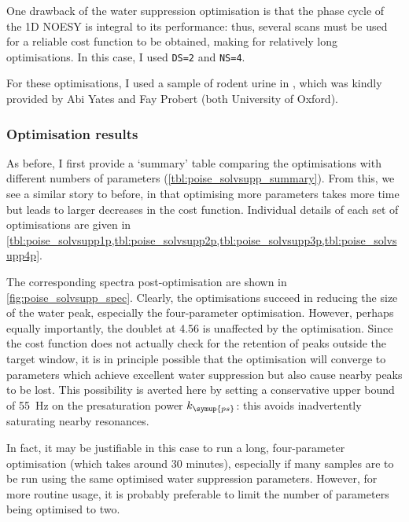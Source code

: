 One drawback of the water suppression optimisation is that the phase cycle of the 1D NOESY is integral to its performance: thus, several scans must be used for a reliable cost function to be obtained, making for relatively long optimisations.
In this case, I used \texttt{DS=2} and \texttt{NS=4}.

For these optimisations, I used a sample of rodent urine in , which was kindly provided by Abi Yates and Fay Probert (both University of Oxford).



\subsubsection{Optimisation results}

As before, I first provide a `summary' table comparing the optimisations with different numbers of parameters (\cref{tbl:poise_solvsupp_summary}).
From this, we see a similar story to before, in that optimising more parameters takes more time but leads to larger decreases in the cost function.
Individual details of each set of optimisations are given in \cref{tbl:poise_solvsupp1p,tbl:poise_solvsupp2p,tbl:poise_solvsupp3p,tbl:poise_solvsupp4p}.

The corresponding spectra post-optimisation are shown in \cref{fig:poise_solvsupp_spec}.
Clearly, the optimisations succeed in reducing the size of the water peak, especially the four-parameter optimisation.
However, perhaps equally importantly, the doublet at \qty{4.56}{\ppm} is unaffected by the optimisation.
Since the cost function does not actually check for the retention of peaks outside the target window, it is in principle possible that the optimisation will converge to parameters which achieve excellent water suppression but also cause nearby peaks to be lost.
This possibility is averted here by setting a conservative upper bound of \qty{55}{\Hz} on the presaturation power $k_{\symup{ps}}$: this avoids inadvertently saturating nearby resonances.

In fact, it may be justifiable in this case to run a long, four-parameter optimisation (which takes around 30 minutes), especially if many samples are to be run using the same optimised water suppression parameters.
However, for more routine usage, it is probably preferable to limit the number of parameters being optimised to two.


